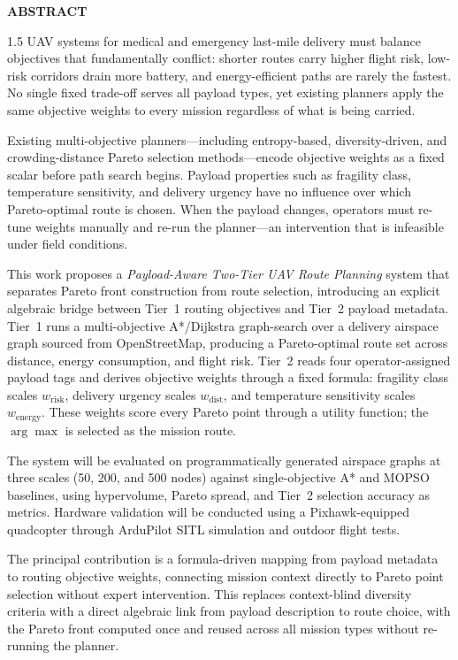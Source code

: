 \documentclass[a4paper, 14pt, oneside]{Thesis}
\begin{document}
\begin{center}
  {\large \bf ABSTRACT \par}
  \bigskip
\end{center}
\begin{spacing}{1.5}
UAV systems for medical and emergency last-mile delivery must balance
objectives that fundamentally conflict: shorter routes carry higher flight
risk, low-risk corridors drain more battery, and energy-efficient paths are
rarely the fastest. No single fixed trade-off serves all payload types, yet
existing planners apply the same objective weights to every mission regardless
of what is being carried.

Existing multi-objective planners---including entropy-based, diversity-driven,
and crowding-distance Pareto selection methods---encode objective weights as a
fixed scalar before path search begins. Payload properties such as fragility
class, temperature sensitivity, and delivery urgency have no influence over
which Pareto-optimal route is chosen. When the payload changes, operators must
re-tune weights manually and re-run the planner---an intervention that is
infeasible under field conditions.

This work proposes a \textit{Payload-Aware Two-Tier UAV Route Planning} system
that separates Pareto front construction from route selection, introducing an
explicit algebraic bridge between Tier~1 routing objectives and Tier~2 payload
metadata. Tier~1 runs a multi-objective A*/Dijkstra graph-search over a
delivery airspace graph sourced from OpenStreetMap, producing a Pareto-optimal
route set across distance, energy consumption, and flight risk. Tier~2 reads
four operator-assigned payload tags and derives objective weights through a
fixed formula: fragility class scales $w_{\mathrm{risk}}$, delivery urgency
scales $w_{\mathrm{dist}}$, and temperature sensitivity scales
$w_{\mathrm{energy}}$. These weights score every Pareto point through a utility
function; the $\arg\max$ is selected as the mission route.

The system will be evaluated on programmatically generated airspace graphs at
three scales (50, 200, and 500 nodes) against single-objective A* and MOPSO
baselines, using hypervolume, Pareto spread, and Tier~2 selection accuracy as
metrics. Hardware validation will be conducted using a Pixhawk-equipped
quadcopter through ArduPilot SITL simulation and outdoor flight tests.

The principal contribution is a formula-driven mapping from payload metadata
to routing objective weights, connecting mission context directly to Pareto
point selection without expert intervention. This replaces context-blind
diversity criteria with a direct algebraic link from payload description to
route choice, with the Pareto front computed once and reused across all mission
types without re-running the planner.
\end{spacing}
\clearpage
\end{document}
